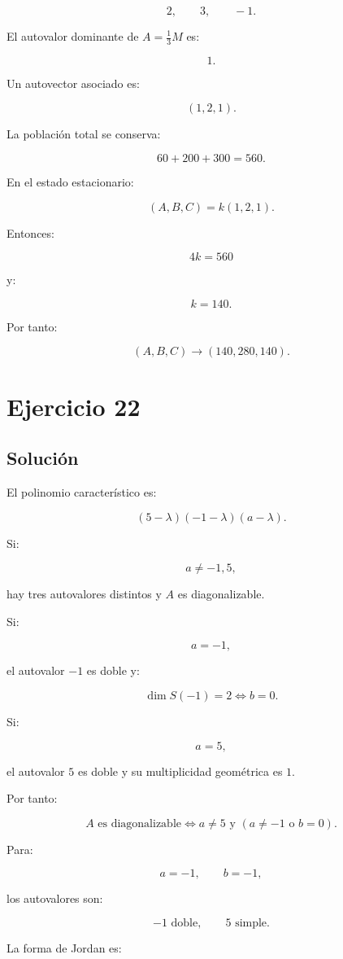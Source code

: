 \documentclass[11pt,a4paper]{article}
\begin{document}
\[
2,\qquad3,\qquad-1.
\]

El autovalor dominante de $A=\frac13M$ es:

\[
1.
\]

Un autovector asociado es:

\[
(1,2,1).
\]

La población total se conserva:

\[
60+200+300=560.
\]

En el estado estacionario:

\[
(A,B,C)=k(1,2,1).
\]

Entonces:

\[
4k=560
\]

y:

\[
k=140.
\]

Por tanto:

\[
\boxed{
(A,B,C)\longrightarrow(140,280,140).
}
\]

\section{Ejercicio 22}
\subsection{Solución}

El polinomio característico es:

\[
(5-\lambda)(-1-\lambda)(a-\lambda).
\]

Si:

\[
a\neq-1,5,
\]

hay tres autovalores distintos y $A$ es diagonalizable.

Si:

\[
a=-1,
\]

el autovalor $-1$ es doble y:

\[
\dim S(-1)=2
\iff
b=0.
\]

Si:

\[
a=5,
\]

el autovalor $5$ es doble y su multiplicidad geométrica es $1$.

Por tanto:

\[
\boxed{
A\text{ es diagonalizable}
\iff
a\neq5
\text{ y }
(a\neq-1\text{ o }b=0).
}
\]

Para:

\[
a=-1,\qquad b=-1,
\]

los autovalores son:

\[
-1\text{ doble},\qquad5\text{ simple}.
\]

La forma de Jordan es:
\end{document}
